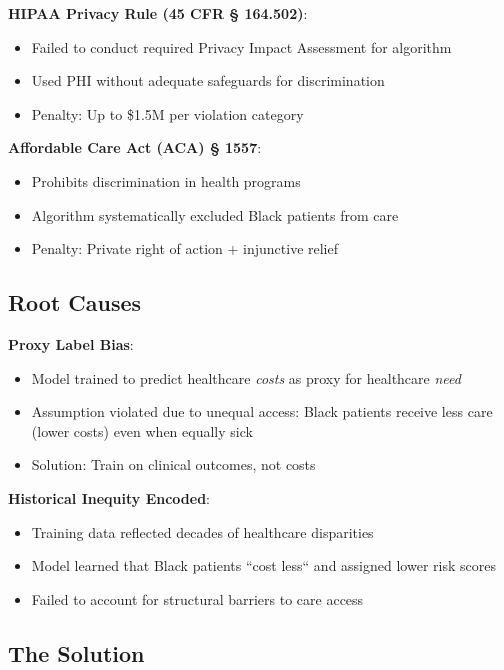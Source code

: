 \textbf{HIPAA Privacy Rule (45 CFR § 164.502)}:
\begin{itemize}
    \item Failed to conduct required Privacy Impact Assessment for algorithm
    \item Used PHI without adequate safeguards for discrimination
    \item Penalty: Up to \$1.5M per violation category
\end{itemize}

\textbf{Affordable Care Act (ACA) § 1557}:
\begin{itemize}
    \item Prohibits discrimination in health programs
    \item Algorithm systematically excluded Black patients from care
    \item Penalty: Private right of action + injunctive relief
\end{itemize}

\subsection{Root Causes}

\textbf{Proxy Label Bias}:
\begin{itemize}
    \item Model trained to predict healthcare \textit{costs} as proxy for healthcare \textit{need}
    \item Assumption violated due to unequal access: Black patients receive less care (lower costs) even when equally sick
    \item Solution: Train on clinical outcomes, not costs
\end{itemize}

\textbf{Historical Inequity Encoded}:
\begin{itemize}
    \item Training data reflected decades of healthcare disparities
    \item Model learned that Black patients ``cost less`` and assigned lower risk scores
    \item Failed to account for structural barriers to care access
\end{itemize}

\subsection{The Solution}

